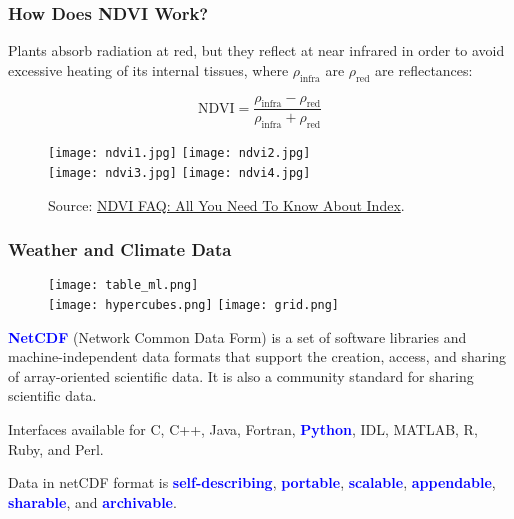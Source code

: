 \documentclass[11pt]{beamer}
\begin{document}
\begin{frame}[fragile]
  \frametitle{\normalsize{\textbf{
    How Does NDVI Work?
  }}} 

  \scriptsize{  

    Plants absorb radiation at red, but they reflect at near
    infrared in order to avoid excessive heating of its internal tissues, 
    where $\rho_{\text{infra}}$ are $\rho_{\text{red}}$ are reflectances:

    \begin{equation}
      \boxed{\text{NDVI} = \frac{\rho_{\text{infra}} -
        \rho_{\text{red}}}{\rho_{\text{infra}} + \rho_{\text{red}}} \nonumber}
    \end{equation} 

    \begin{figure}[h!]
      \centering
      \texttt{[image: ndvi1.jpg]}
      \texttt{[image: ndvi2.jpg]} \\
      \texttt{[image: ndvi3.jpg]}
      \texttt{[image: ndvi4.jpg]}
      \caption*{\scriptsize{
          Source: \href{https://eos.com/blog/ndvi-faq-all-you-need-to-know-about-ndvi/}{NDVI FAQ: All You Need To Know About Index}.
      }}
    \end{figure}

  }
\end{frame}

\begin{frame}
  \frametitle{\normalsize{\textbf{
        Weather and Climate Data
  }}}

  \scriptsize{
    
    \begin{figure}[h!]
      \centering
      \texttt{[image: table\_ml.png]} \\
      \texttt{[image: hypercubes.png]} 
      \texttt{[image: grid.png]}
    \end{figure}
    
    \textbullet \: \textbf{\textcolor{blue}{NetCDF}} (Network Common Data Form) is a set of software 
    libraries and machine-independent data formats that support the creation, 
    access, and sharing of array-oriented scientific data. It is also a community 
    standard for sharing scientific data. 

    \textbullet \: Interfaces available for C, C++, Java, Fortran, 
    \textbf{\textcolor{blue}{Python}}, IDL, MATLAB, R, Ruby, and Perl.

    \textbullet \: Data in netCDF format is \textbf{\textcolor{blue}{self-describing}}, 
    \textbf{\textcolor{blue}{portable}}, \textbf{\textcolor{blue}{scalable}}, 
    \textbf{\textcolor{blue}{appendable}}, \textbf{\textcolor{blue}{sharable}}, and 
    \textbf{\textcolor{blue}{archivable}}. 
  }
\end{frame}
\end{document}
